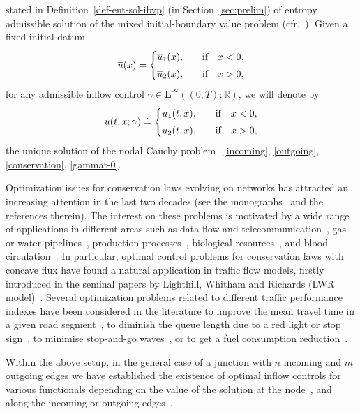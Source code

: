 \documentclass[a4paper, 10pt, final]{article}
\newcommand{\R}{\mathbb{R}} \newcommand{\N}{\mathbb{N}}
\begin{document}
stated in Definition~\ref{def-ent-sol-ibvp} 
(in Section~\ref{sec:prelim}) of entropy admissible solution of the mixed initial-boundary
value problem (cfr.~\cite{lf}).
Given a fixed initial datum
\begin{equation}
\label{indatum}
    \overline u(x)=
    \begin{cases}
        \overline u_1(x),\quad&\text{if}\quad x<0,
        \\
        \noalign{\smallskip}
        \overline u_2(x),\quad&\text{if}\quad x>0,
    \end{cases}
\end{equation}
for any admissible inflow control 
$\gamma\in \mathbf{L^\infty}((0,T);\R)$,
we will denote by 
\begin{equation}\label{ugamma} 
  u(t,x; \gamma)\doteq \begin{cases}u_1(t,x),\quad&\text{if}\quad x<0, \\ 
\noalign{\smallskip}
u_2(t,x), \quad&\text{if}\quad x>0,\end{cases}
\end{equation} 
the unique solution of the nodal Cauchy problem 
~\eqref{incoming}, \eqref{outgoing}, \eqref{conservation}, \eqref{gammat-0}.

Optimization issues for conservation laws evolving on networks has attracted 
an increasing attention in the last two decades (see the monographs~\cite{bdggp,bcghp,g-h-p} and the references therein). 
The interest on these problems is motivated by a wide range of applications in  different areas
such as data flow and telecommunication~\cite{cmpr}, 
gas or water pipelines~\cite{cghs,hlmss}, production 
processes~\cite{Da-G-H-P, Da-M-H-P, hfy, LM-A-H-R}, 
biological resources~\cite{CoGa}, and 
blood circulation~\cite{ca-d-d-m}.
In particular, optimal control problems for conservation laws with concave flux 
have found a natural application in traffic flow models, firstly introduced in the seminal papers by Lighthill, Whitham and 
Richards (LWR model)~\cite{li-whi,ri}.
Several optimization problems related to different
traffic performance indexes have been considered in the literature 
to  improve the mean travel time in
a given road segment~\cite{am1,am2,cdpr1,goatin-piacentini,tk},  
to diminish
the queue length due to a red light or stop sign~\cite{colombo-rossi},
to minimise stop-and-go waves~\cite{cgr,col-gro,
tsmh}, 
or to get a fuel consumption reduction~\cite{ac, ramadan}.

Within the above setup,
in the general case of a junction with $n$ incoming and $m$ outgoing edges  
we have established the existence of optimal inflow controls 
for
various functionals depending on the 
value of the solution at
the node~\cite{accg},
and along the incoming or outgoing 
edges~\cite{accg2}. 
\end{document}

